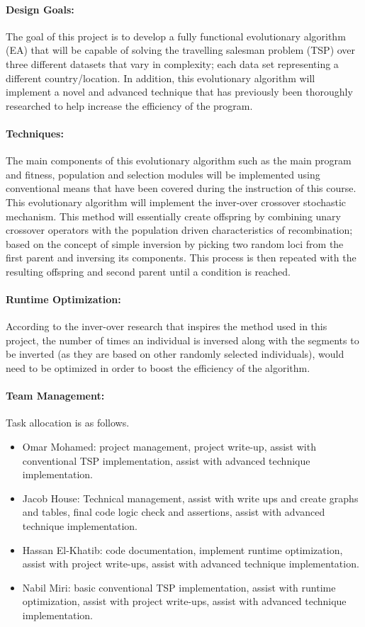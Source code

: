 	\paragraph{Design Goals:} The goal of this project is to develop a fully functional evolutionary algorithm (EA) that will be capable of solving the travelling salesman problem (TSP) over three different datasets that vary in complexity; each data set representing a different country/location. In addition, this evolutionary algorithm will implement a novel and advanced technique that has previously been thoroughly researched to help increase the efficiency of the program.
	
	\paragraph{Techniques:} The main components of this evolutionary algorithm such as the main program and fitness, population and selection modules will be implemented using conventional means that have been covered during the instruction of this course. This evolutionary algorithm will implement the inver-over crossover stochastic mechanism. This method will essentially create offspring by combining unary crossover operators with the population driven characteristics of recombination; based on the concept of simple inversion by picking two random loci from the first parent and inversing its components. This process is then repeated with the resulting offspring and second parent until a condition is reached.
	
	\paragraph{Runtime Optimization:} According to the inver-over research that inspires the method used in this project, the number of times an individual is inversed along with the segments to be inverted (as they are based on other randomly selected individuals), would need to be optimized in order to boost the efficiency of the algorithm.
	
	\paragraph{Team Management:} Task allocation is as follows.
	\begin{itemize}
		\item Omar Mohamed: project management, project write-up, assist with conventional TSP implementation, assist with advanced technique implementation.
		\item Jacob House: Technical management, assist with write ups and create graphs and tables, final code logic check and assertions, assist with advanced technique implementation.
		\item Hassan El-Khatib: code documentation, implement runtime optimization, assist with project write-ups, assist with advanced technique implementation.
		\item Nabil Miri: basic conventional TSP implementation, assist with runtime optimization, assist with project write-ups, assist with advanced technique implementation.
	\end{itemize}
	
	\nocite{*}
	\printbibliography

